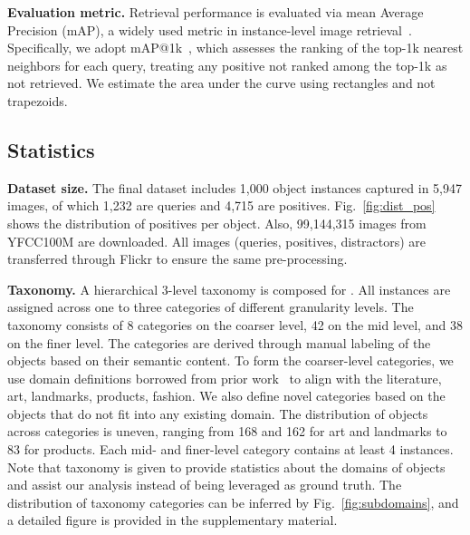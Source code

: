 \noindent\textbf{Evaluation metric.}
Retrieval performance is evaluated via mean Average Precision (mAP), a widely used metric in instance-level image retrieval~\citep{rtc19,pci+07,pci+08}. Specifically, we adopt mAP@1k~\cite{wac+20}, which assesses the ranking of the top-1k nearest neighbors for each query, treating any positive not ranked among the top-1k as not retrieved. 
We estimate the area under the curve using rectangles and not trapezoids.


\subsection{Statistics}
\label{sec:statistics}

\noindent\textbf{Dataset size.} The final \ours dataset includes 1,000 object instances captured in 5,947 images, of which 1,232 are queries and 4,715 are positives.
Fig.~\ref{fig:dist_pos} shows the distribution of positives per object. Also, 99,144,315 images from YFCC100M are downloaded. All images (queries, positives, distractors) are transferred through Flickr to ensure the same pre-processing.

\noindent\textbf{Taxonomy.} A hierarchical 3-level taxonomy is composed for \ours. All instances are assigned across one to three categories of different granularity levels. The taxonomy consists of 8 categories on the coarser level, 42 on the mid level, and 38 on the finer level. The categories are derived through manual labeling of the objects based on their semantic content. To form the coarser-level categories, we use domain definitions borrowed from prior work~\cite{wac+20,sxj+15,liu2016deepfashion} to align with the literature, \ie art, landmarks, products, fashion. We also define novel categories based on the objects that do not fit into any existing domain. The distribution of objects across categories is uneven, \eg ranging from 168 and 162 for art and landmarks to 83 for products. Each mid- and finer-level category contains at least 4 instances. Note that taxonomy is given to provide statistics about the domains of objects and assist our analysis instead of being leveraged as ground truth. The distribution of taxonomy categories can be inferred by Fig.~\ref{fig:subdomains}, and a detailed figure is provided in the supplementary material.

